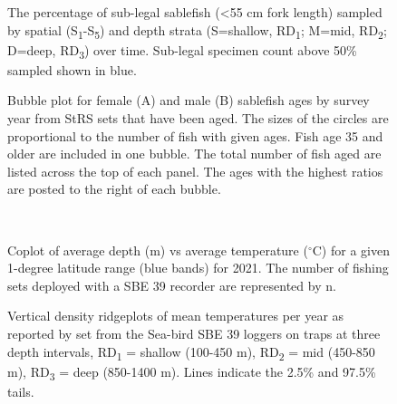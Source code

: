 \documentclass[12pt]{article}\usepackage[]{graphicx}\usepackage[]{color}
\begin{document}
\begin{figure}[htb]

{\centering {} 

}

\caption{The percentage of sub-legal sablefish (\textless55 cm fork length) sampled by spatial (S\textsubscript{1}-S\textsubscript{5}) and depth strata (S=shallow, RD\textsubscript{1}; M=mid, RD\textsubscript{2}; D=deep, RD\textsubscript{3}) over time. Sub-legal specimen count above 50\% sampled shown in blue.}\label{fig:figure15}
\end{figure}
\clearpage


\begin{figure}[htb]

{\centering {} 

}

\caption{Bubble plot for female (A) and male (B) sablefish ages by survey year from StRS sets that have been aged. The sizes of the circles are proportional to the number of fish with given ages. Fish age 35 and older are included in one bubble. The total number of fish aged are listed across the top of each panel. The ages with the highest ratios are posted to the right of each bubble.}\label{fig:figure16}
\end{figure}
\clearpage

~\\

\begin{figure}[htb]

{\centering {} 

}

\caption{Coplot of average depth (m) vs average temperature (\(^\circ\)C) for a given 1-degree latitude range (blue bands) for 2021. The number of fishing sets deployed with a SBE 39 recorder are represented by n.}\label{fig:figure17}
\end{figure}
\clearpage


\begin{figure}[htb]

{\centering {} 

}

\caption{Vertical density ridgeplots of mean temperatures per year as reported by set from the Sea-bird SBE 39 loggers on traps at three depth intervals, RD\textsubscript{1} = shallow (100-450 m), RD\textsubscript{2} = mid (450-850 m), RD\textsubscript{3} = deep (850-1400 m). Lines indicate the 2.5\% and 97.5\% tails.}\label{fig:figure18}
\end{figure}
\clearpage
\end{document}
